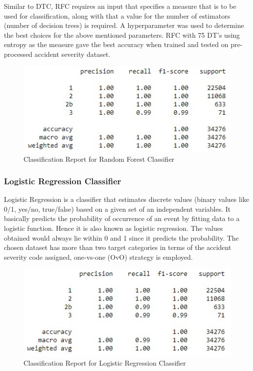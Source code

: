 \documentclass{article}
\begin{document}
Similar to DTC, RFC requires an input that specifies a measure that is to be used for classification, along with that a value for the number of estimators (number of decision trees) is required. A hyperparameter was used to determine the best choices for the above mentioned parameters. RFC with 75 DT’s using entropy as the measure gave the best accuracy when trained and tested on pre-processed accident severity dataset.

\begin{figure}[h]
  \centering
  \includegraphics[scale=0.8]{rfcreport.jpg}
  \caption{Classification Report for Random Forest Classifier}
\end{figure}

\subsubsection{Logistic Regression Classifier}

Logistic Regression is a classifier that estimates discrete values (binary values like 0/1, yes/no, true/false) based on a given set of an independent variables. It basically predicts the probability of occurrence of an event by fitting data to a logistic function. Hence it is also known as logistic regression. The values obtained would always lie within 0 and 1 since it predicts the probability. The chosen dataset has more than two target categories in terms of the accident severity code assigned, one-vs-one (OvO) strategy is employed.

\begin{figure}[h]
  \centering
  \includegraphics[scale=0.8]{logregreport.jpg}
  \caption{Classification Report for Logistic Regression Classifier}
\end{figure}
\end{document}
